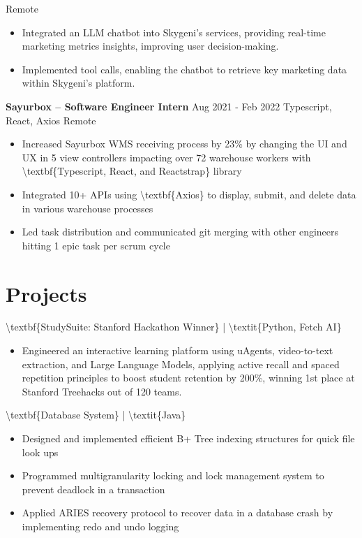 \documentclass{article}%
\begin{document}
\hspace*{1em}%
Remote%
\newline%
\begin{itemize}%
\item%
Integrated an LLM chatbot into Skygeni's services, providing real{-}time marketing metrics insights, improving user decision{-}making.%
\item%
Implemented tool calls, enabling the chatbot to retrieve key marketing data within Skygeni's platform.%
\end{itemize}%
\newline%
\textbf{Sayurbox – Software Engineer Intern}%
\hspace*{1em}%
Aug 2021 {-}  Feb 2022%
\newline%
Typescript, React, Axios%
\hspace*{1em}%
Remote%
\newline%
\begin{itemize}%
\item%
Increased Sayurbox WMS receiving process by 23\% by changing the UI and UX in 5 view controllers impacting over 72 warehouse workers with \textbackslash{}textbf\{Typescript, React, and Reactstrap\} library%
\item%
Integrated 10+ APIs using \textbackslash{}textbf\{Axios\} to display, submit, and delete data in various warehouse processes%
\item%
Led task distribution and communicated git merging with other engineers hitting 1 epic task per scrum cycle%
\end{itemize}%
\newline%
\newline%
\section{Projects}%
\label{sec:Projects}%
\textbackslash{}textbf\{StudySuite: Stanford Hackathon Winner\} | \textbackslash{}textit\{Python, Fetch AI\}%
\newline%
\begin{itemize}%
\item%
Engineered an interactive learning platform using uAgents, video{-}to{-}text extraction, and Large Language Models, applying active recall and spaced repetition principles to boost student retention by 200\%, winning 1st place at Stanford Treehacks out of 120 teams.%
\end{itemize}%
\newline%
\textbackslash{}textbf\{Database System\} | \textbackslash{}textit\{Java\}%
\newline%
\begin{itemize}%
\item%
Designed and implemented efficient B+ Tree indexing structures for quick file look ups%
\item%
Programmed multigranularity locking and lock management system to prevent deadlock in a transaction%
\item%
Applied ARIES recovery protocol to recover data in a database crash by implementing redo and undo logging%
\end{itemize}
\end{document}
